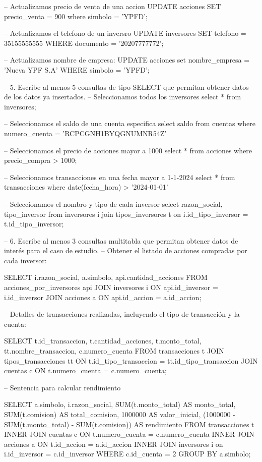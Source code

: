 – Actualizamos precio de venta de una accion
UPDATE acciones
SET precio_venta = 900
where simbolo = 'YPFD';

– Actualizamos el telefono de un inversro
UPDATE inversores
SET telefono = 35155555555
WHERE documento = '20207777772';

– Actualizamos nombre de empresa:
UPDATE acciones
set nombre_empresa = 'Nueva YPF S.A'
WHERE simbolo = 'YPFD';

– 5. Escribe al menos 5 consultas de tipo SELECT que permitan obtener datos de los
datos ya insertados.
– Seleccionamos todos los inversores
select * from inversores;

– Seleccionamos el saldo de una cuenta especifica
select saldo from cuentas
where numero_cuenta = 'RCPCGNH1BYQGNUMNR54Z'

– Seleccionamos el precio de acciones mayor a 1000
select * from acciones
where precio_compra > 1000;

– Seleccionamos transacciones en una fecha mayor a 1-1-2024
select * from transacciones
where date(fecha_hora) > '2024-01-01'

– Seleccionamos el nombro y tipo de cada inversor
select razon_social, tipo_inversor
from inversores i
join tipos_inversores t on i.id_tipo_inversor = t.id_tipo_inversor;

– 6. Escribe al menos 3 consultas multitabla que permitan obtener datos de interés para
el caso de estudio.
– Obtener el listado de acciones compradas por cada inversor: 

SELECT i.razon_social, a.simbolo, api.cantidad_acciones FROM acciones_por_inversores api JOIN inversores i ON api.id_inversor = i.id_inversor JOIN acciones a ON api.id_accion = a.id_accion; 

– Detalles de transacciones realizadas, incluyendo el tipo de transacción y la cuenta: 

SELECT t.id_transaccion, t.cantidad_acciones, t.monto_total, tt.nombre_transaccion, c.numero_cuenta FROM transacciones t JOIN tipos_transacciones tt ON t.id_tipo_transaccion = tt.id_tipo_transaccion JOIN cuentas c ON t.numero_cuenta = c.numero_cuenta; 


– Sentencia para calcular rendimiento

SELECT a.simbolo, i.razon_social,
                       SUM(t.monto_total) AS monto_total,
                       SUM(t.comision) AS total_comision,
                       1000000 AS valor_inicial,
                       (1000000 - SUM(t.monto_total) - SUM(t.comision)) AS rendimiento
                FROM transacciones t 
                INNER JOIN cuentas c ON t.numero_cuenta = c.numero_cuenta 
                INNER JOIN acciones a ON t.id_accion = a.id_accion
                INNER JOIN inversores i on i.id_inversor = c.id_inversor
                WHERE c.id_cuenta = 2
                GROUP BY a.simbolo;       